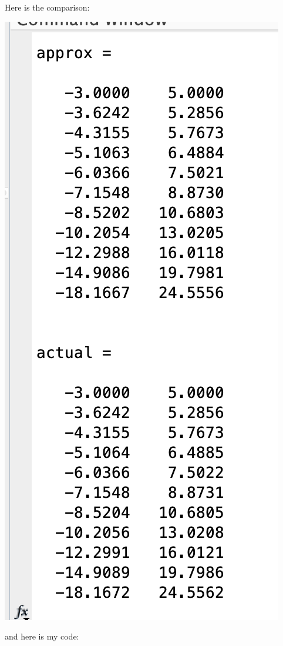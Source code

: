 \documentclass{article}
\begin{document}
    \begin{answer}
        Here is the comparison:
            \begin{center}
                \includegraphics[scale=0.5]{q1}
            \end{center}
        and here is my code:
        \inputminted{matlab}{./code/RKsystem.m}
        \inputminted{matlab}{./code/q1f1.m}
        \inputminted{matlab}{./code/q1f2.m}
        \inputminted{matlab}{./code/q1actf1.m}
        \inputminted{matlab}{./code/q1actf2.m}
        \inputminted{matlab}{./code/evalAct.m}
        \inputminted{matlab}{./code/script1.m}
    \end{answer}
\end{document}

